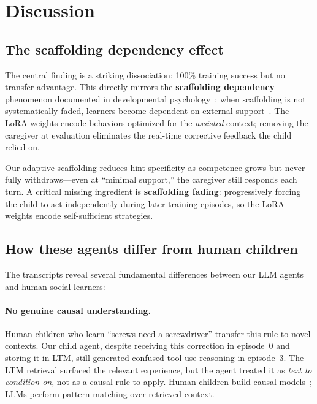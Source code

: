 \documentclass{article}
\begin{document}
\section{Discussion}

\subsection{The scaffolding dependency effect}

The central finding is a striking dissociation: 100\% training success but no transfer advantage. This directly mirrors the \textbf{scaffolding dependency} phenomenon documented in developmental psychology~\citep{wood1976role}: when scaffolding is not systematically faded, learners become dependent on external support~\citep{puntambekar2005tools}. The LoRA weights encode behaviors optimized for the \emph{assisted} context; removing the caregiver at evaluation eliminates the real-time corrective feedback the child relied on.

Our adaptive scaffolding reduces hint specificity as competence grows but never fully withdraws---even at ``minimal support,'' the caregiver still responds each turn. A critical missing ingredient is \textbf{scaffolding fading}: progressively forcing the child to act independently during later training episodes, so the LoRA weights encode self-sufficient strategies.

\subsection{How these agents differ from human children}
\label{sec:agents_vs_humans}

The transcripts reveal several fundamental differences between our LLM agents and human social learners:

\paragraph{No genuine causal understanding.} Human children who learn ``screws need a screwdriver'' transfer this rule to novel contexts. Our child agent, despite receiving this correction in episode~0 and storing it in LTM, still generated confused tool-use reasoning in episode~3. The LTM retrieval surfaced the relevant experience, but the agent treated it as \emph{text to condition on}, not as a causal rule to apply. Human children build causal models~\citep{baker2017rational}; LLMs perform pattern matching over retrieved context.
\end{document}
